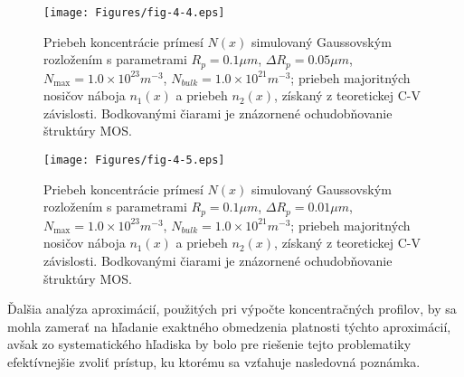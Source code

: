 \begin{figure}[h!]\centering
  \begin{minipage}[c]{\myfiguresize}
    \begin{center}
      \texttt{[image: Figures/fig-4-4.eps]}
      \caption[Priebeh koncentrácie prímesí simulovaný Gaussovským
        rozložením]{Priebeh koncentrácie prímesí $N(x)$ simulovaný
        Gaussovským rozložením s parametrami $R_{p}=0.1\mu m$, $\Delta
        R_{p}=0.05\mu m$, $N_{\max}=1.0\times 10^{23} m^{-3}$,
        $N_{bulk}=1.0\times10^{21}m^{-3}$; priebeh majoritných nosičov
        náboja $n_{1}(x)$ a priebeh $n_{2}(x)$, získaný z teoretickej
        C-V závislosti. Bodkovanými čiarami je znázornené
        ochudobňovanie štruktúry MOS.}\label{fig:4.4}
    \end{center}
  \end{minipage}
\end{figure}

\begin{figure}[h!]\centering
  \begin{minipage}[c]{\myfiguresize}
    \begin{center}
      \texttt{[image: Figures/fig-4-5.eps]}
      \caption[Priebeh koncentrácie prímesí simulovaný Gaussovským
        rozložením]{Priebeh koncentrácie prímesí $N(x)$ simulovaný
        Gaussovským rozložením s parametrami $R_{p}=0.1\mu m$, $\Delta
        R_{p}=0.01\mu m$, $N_{\max}=1.0\times10^{23}m^{-3}$,
        $N_{bulk}=1.0\times10^{21}m^{-3}$; priebeh majoritných nosičov
        náboja $n_{1}(x)$ a priebeh $n_{2}(x)$, získaný z teoretickej
        C-V závislosti. Bodkovanými čiarami je znázornené
        ochudobňovanie štruktúry MOS.}\label{fig:4.5}
    \end{center}
  \end{minipage}
\end{figure}

\par Ďalšia analýza aproximácií, použitých pri výpočte koncentračných
profilov, by sa mohla zamerať na hľadanie exaktného obmedzenia
platnosti týchto aproximácií, avšak zo systematického hľadiska by bolo
pre riešenie tejto problematiky efektívnejšie zvoliť prístup, ku
ktorému sa vzťahuje nasledovná poznámka.

